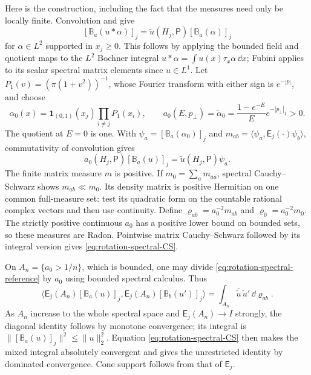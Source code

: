 Here is the construction, including the fact that the measures
need only be locally finite. Convolution and
 give
\[
 [\mathbb B_a(u*\alpha)]_j
       =\widetilde u(H_j,\mathsf P)[\mathbb B_a(\alpha)]_j
\]
for $\alpha\in L^2$ supported in $x_j\ge0$.
This follows by applying the bounded field and quotient maps to
the $L^2$ Bochner integral
$u*\alpha=\int u(x)\tau_x\alpha\,\dd x$;
Fubini applies to its scalar spectral matrix elements since
$u\in L^1$.
Let $P_1(v)=(\pi(1+v^2))^{-1}$, whose Fourier transform with
either sign is $e^{-|p|}$, and choose
\[
 \alpha_0(x)=\mathbf1_{(0,1)}(x_j)\prod_{i\ne j}P_1(x_i),
 \qquad
 a_0(E,p_\perp)=\widetilde\alpha_0
       =\frac{1-e^{-E}}{E}e^{-|p_\perp|_1}>0.
\]
The quotient at $E=0$ is one. With
$\psi_a=[\mathbb B_a(\alpha_0)]_j$ and
$m_{ab}=\langle\psi_a,\mathsf E_j(\cdot)\psi_b\rangle$,
commutativity of convolution gives
\begin{equation}\label{eq:rotation-spectral-reference}
 a_0(H_j,\mathsf P)[\mathbb B_a(u)]_j
       =\widetilde u(H_j,\mathsf P)\psi_a.
\end{equation}
The finite matrix measure $m$ is positive. If $m_0=\sum_a m_{aa}$,
spectral Cauchy--Schwarz shows $m_{ab}\ll m_0$.
Its density matrix is positive Hermitian on one common full-measure
set: test its quadratic form on the countable rational complex
vectors and then use continuity. Define
$\varrho_{ab}=a_0^{-2}m_{ab}$ and $\varrho_0=a_0^{-2}m_0$.
The strictly positive continuous $a_0$ has a positive lower bound
on bounded sets, so these measures are Radon.
Pointwise matrix Cauchy--Schwarz followed by its integral version
gives \eqref{eq:rotation-spectral-CS}.

On $A_n=\{a_0>1/n\}$, which is bounded, one may divide
\eqref{eq:rotation-spectral-reference} by $a_0$ using bounded
spectral calculus. Thus
\[
 \big\langle\mathsf E_j(A_n)[\mathbb B_a(u)]_j,
             \mathsf E_j(A_n)[\mathbb B_b(u')]_j\big\rangle
       =\int_{A_n}\overline{\widetilde u}\,\widetilde u'
                                                  \,\dd\varrho_{ab}.
\]
As $A_n$ increase to the whole spectral space and
$\mathsf E_j(A_n)\to I$ strongly,
the diagonal identity follows by monotone convergence; its integral
is $\|[\mathbb B_a(u)]_j\|^2\le\|u\|_2^2$.
Equation \eqref{eq:rotation-spectral-CS} then makes the mixed
integral absolutely convergent and gives the unrestricted identity
by dominated convergence. Cone support follows from that of
$\mathsf E_j$.

